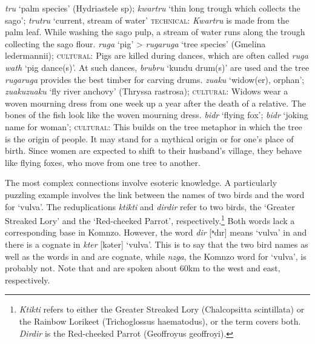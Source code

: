 \begin{exe}
\ex
\label{ex639}
\begin{xlist}
	\ex \label{ex640} \emph{tru} `palm species' (Hydriastele sp); \emph{kwartru} `thin long trough which collects the sago'; \emph{trutru} `current, stream of water' \textsc{technical:} \emph{Kwartru} is made from the palm leaf. While washing the sago pulp, a stream of water runs along the trough collecting the sago flour.
	\ex \label{ex641} \emph{ruga} `pig' > \emph{rugaruga} `tree species' (Gmelina ledermannii); \textsc{cultural:} Pigs are killed during dances, which are often called \emph{ruga wath} `pig dance(s)'. At such dances, \emph{brubru} `kundu drum(s)' are used and the tree \emph{rugaruga} provides the best timber for carving drums.
	\ex \label{ex642} \emph{zuaku} `widow(er), orphan'; \emph{zuakuzuaku} `fly river anchovy' (Thryssa rastrosa); \textsc{cultural:} Widows wear a woven mourning dress from one week up a year after the death of a relative. The bones of the fish look like the woven mourning dress.
	\ex \label{ex643} \emph{bidr} `flying fox'; \emph{bidr} `joking name for woman'; \textsc{cultural:} This builds on the tree metaphor in which the tree is the origin of people. It may stand for a mythical origin or for one's place of birth. Since women are expected to shift to their husband's village, they behave like flying foxes, who move from one tree to another.
\end{xlist}
\end{exe}%

The most complex connections involve esoteric knowledge. A particularly puzzling example involves the link between the names of two birds and the word for `vulva'. The reduplications \emph{ktikti} and \emph{dirdir} refer to two birds, the  `Greater Streaked Lory' and the `Red-cheeked Parrot', respectively.\footnote{\emph{Ktikti} refers to either the Greater Streaked Lory (Chalcopsitta scintillata) or the Rainbow Lorikeet (Trichoglossus haematodus), or the term covers both. \emph{Dirdir} is the Red-cheeked Parrot (Geoffroyus geoffroyi).} Both words lack a corresponding base in Komnzo. However, the word \emph{dir} [{ⁿ}dır] means `vulva' in  and there is a cognate in  \emph{kter} [kəter] `vulva'. This is to say that the two bird names as well as the words in  and  are cognate, while \emph{nzga}, the Komnzo word for `vulva', is probably not. Note that  and  are spoken about 60km to the west and east, respectively.

